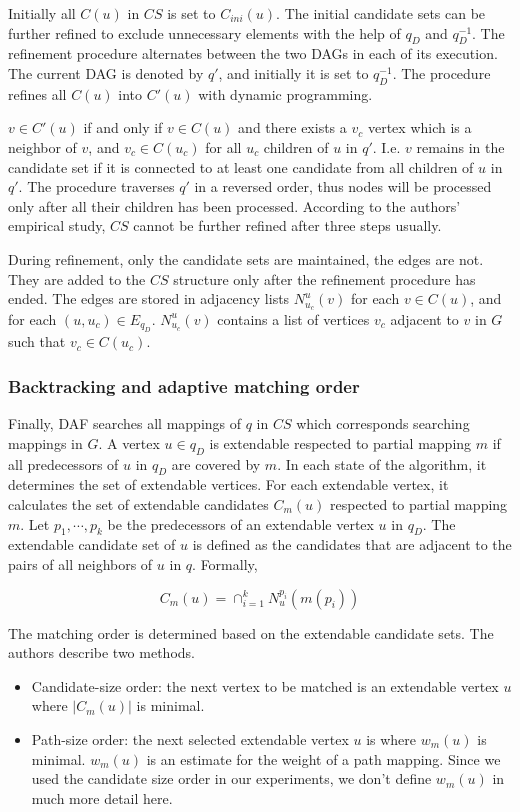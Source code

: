 Initially all $C(u)$ in $CS$ is set to $C_{ini}(u)$. The initial candidate sets can be further refined
to exclude unnecessary elements with the help of $q_D$ and $q^{-1}_D$. The refinement procedure alternates
between the two DAGs in each of its execution. The current DAG is denoted by $q'$, and initially it is set
to $q^{-1}_D$. The procedure refines all $C(u)$ into $C'(u)$ with dynamic programming.

$v \in C'(u)$ if and only if $v \in C(u)$ and there exists a $v_c$ vertex which is a neighbor of $v$, and
$v_c \in C(u_c)$ for all $u_c$ children of $u$ in $q'$. I.e. $v$ remains in the candidate set if it is
connected to at least one candidate from all children of $u$ in $q'$. The procedure traverses $q'$ in a
reversed order, thus nodes will be processed only after all their children has been processed. According to
the authors' empirical study, $CS$ cannot be further refined after three steps usually.

During refinement, only the candidate sets are maintained, the edges are not. They are added to the $CS$
structure only after the refinement procedure has ended. The edges are stored in adjacency lists $N^u_{u_c}(v)$
for each $v \in C(u)$, and for each $(u, u_c) \in E_{q_D}$. $N^u_{u_c}(v)$ contains a list of vertices $v_c$
adjacent to $v$ in $G$ such that $v_c \in C(u_c)$.

\subsubsection{Backtracking and adaptive matching order}

Finally, DAF searches all mappings of $q$ in $CS$ which corresponds searching mappings in $G$. A vertex $u \in q_D$
is extendable respected to partial mapping $m$ if all predecessors of $u$ in $q_D$ are covered by $m$. In each state
of the algorithm, it determines the set of extendable vertices. For each extendable vertex, it calculates the set of
extendable candidates $C_m(u)$ respected to partial mapping $m$. Let $p_1, \cdots, p_k$ be the predecessors of an
extendable vertex $u$ in $q_D$. The extendable candidate set of $u$ is defined as the candidates that are adjacent to
the pairs of all neighbors of $u$ in $q$. Formally,

\[ C_m(u) = \cap^k_{i=1} N^{p_i}_u(m(p_i)) \]

The matching order is determined based on the extendable candidate sets. The authors describe two methods.
\begin{itemize}
    \item Candidate-size order: the next vertex to be matched is an extendable vertex $u$ where $|C_m(u)|$ is minimal.
    \item Path-size order: the next selected extendable vertex $u$ is where $w_m(u)$ is minimal. $w_m(u)$ is an estimate for the weight of a path mapping. Since we used the candidate size order in our experiments, we don't define $w_m(u)$ in much more detail here.
\end{itemize}

